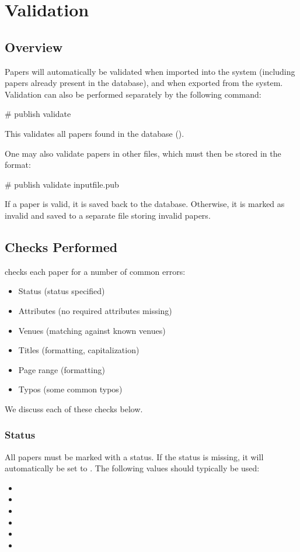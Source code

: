 \chapter{Validation}
\label{validate}
\section{Overview}

Papers will automatically be validated when imported into the system
(including papers already present in the database), and when exported
from the system.
Validation can also be performed separately by the following command:
\begin{code}
# publish validate
\end{code}
This validates all papers found in the database ().

One may also validate papers in other files, which must then be stored
in the  format:
\begin{code}
# publish validate inputfile.pub
\end{code}

If a paper is valid, it is saved back to the database. Otherwise, it
is marked as invalid and saved to a separate file storing invalid
papers.

\section{Checks Performed}

\package{} checks each paper for a number of common errors:
\begin{itemize}
\item
  Status (status specified)
\item
  Attributes (no required attributes missing)
\item
  Venues (matching against known venues)
\item
  Titles (formatting, capitalization)
\item
  Page range (formatting)
\item
  Typos (some common typos)
\end{itemize}
We discuss each of these checks below.

\subsection{Status}

All papers must be marked with a status. If the status is missing, it
will automatically be set to . The following values
should typically be used:
\begin{itemize}
  \item
  \item
  \item
  \item
  \item
  \item
\end{itemize}

